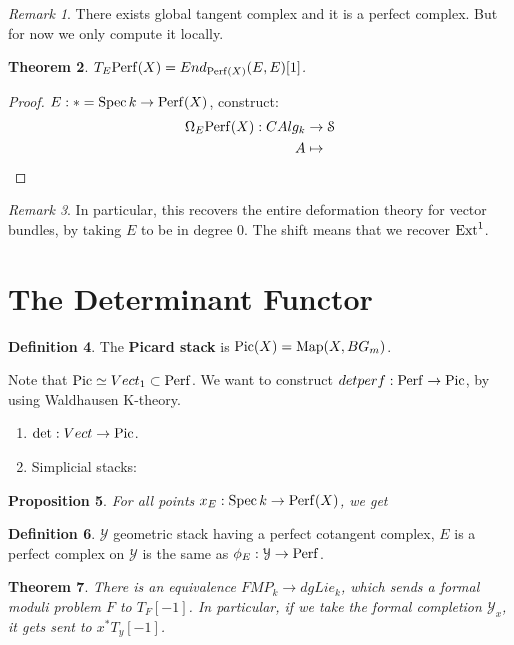 \documentclass[10pt,a4paper,reqno,oneside]{book} %
\theoremstyle{plain}
\newtheorem{thm}{Theorem}[section]
\newtheorem{prop}[thm]{Proposition}
\theoremstyle{definition}
\newtheorem{defin}[thm]{Definition}
\theoremstyle{remark}
\newtheorem{rem}[thm]{Remark}
\numberwithin{equation}{section}
\begin{document}
\begin{rem}
There exists global tangent complex and it is a perfect complex. But for now we only compute it locally.
\end{rem}

\begin{thm}
$T_E \mathrm{Perf}(X) = End_{\mathrm{Perf}(X)}(E,E) [1]$. 
\end{thm}
\begin{proof}
$E : * = \operatorname{Spec} k \to \mathrm{Perf}(X)$, construct:
\begin{align*}
\Omega_E \mathrm{Perf}(X) : CAlg_k &\to \mathcal S \\
A &\mapsto 
\end{align*}
\end{proof}


\begin{rem}
In particular, this recovers the entire deformation theory for vector bundles, by taking $E$ to be in degree 0. The shift means
that we recover $\operatorname{Ext}^1$. 
\end{rem}


\section{The Determinant Functor}
\begin{defin}
The \textbf{Picard stack} is $\operatorname{Pic}(X) = \operatorname{Map}(X, B G_m)$.
\end{defin}

Note that $\operatorname{Pic} \simeq Vect_1 \subset \mathrm{Perf}$. We want to construct $detperf: \mathrm{Perf} \to \operatorname{Pic}$, by using Waldhausen K-theory.
\begin{enumerate}
\item $\det : Vect \to \operatorname{Pic}$.
\item Simplicial stacks:
\end{enumerate}


\begin{prop}
For all points $x_E: \operatorname{Spec} k \to \mathrm{Perf}(X)$, we get 
\end{prop}

\begin{defin}
$\mathcal{Y}$ geometric stack having a perfect cotangent complex, $E$ is a perfect complex on $\mathcal{Y}$ is the same as
$\phi_E : \mathcal{Y} \to \mathrm{Perf}$. 
\end{defin}


\begin{thm}
There is an equivalence $FMP_k \to dgLie_k$, which sends a formal moduli problem $F$ to $T_F[-1]$. In particular, if we
take the formal completion $\mathcal{Y}_x$, it gets sent to $x^* T_y[-1]$.
\end{thm}
\end{document}
